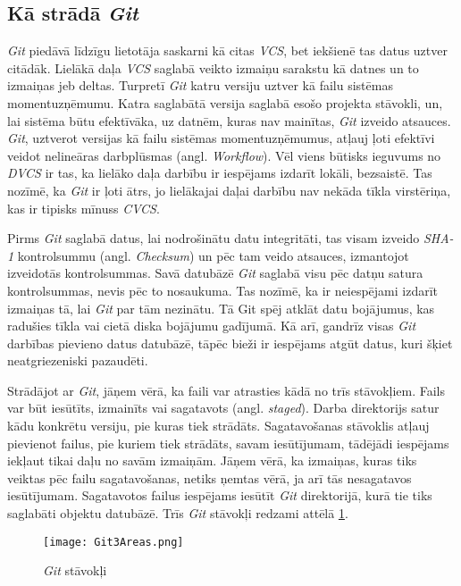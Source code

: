 \subsection{Kā strādā  \textit{Git}}
 \textit{Git} piedāvā līdzīgu lietotāja saskarni kā citas  \textit{VCS}, bet iekšienē tas datus uztver citādāk. Lielākā daļa  \textit{VCS} saglabā veikto izmaiņu sarakstu kā datnes un to izmaiņas jeb deltas.
Turpretī  \textit{Git} katru versiju uztver kā failu sistēmas momentuzņēmumu. Katra saglabātā versija saglabā esošo projekta stāvokli, un, lai sistēma būtu efektīvāka, uz datnēm, kuras nav mainītas,  \textit{Git} izveido atsauces.  \textit{Git}, uztverot versijas kā failu sistēmas momentuzņēmumus, atļauj ļoti efektīvi veidot nelineāras darbplūsmas (angl. \textit{Workflow}).
Vēl viens būtisks ieguvums no  \textit{DVCS} ir tas, ka lielāko daļa darbību ir iespējams izdarīt lokāli, bezsaistē. Tas nozīmē, ka  \textit{Git} ir ļoti ātrs, jo lielākajai daļai darbību nav nekāda tīkla virstēriņa, kas ir tipisks mīnuss \textit{CVCS}.

Pirms \textit{Git} saglabā datus, lai nodrošinātu datu integritāti, tas visam izveido \textit{SHA-1} kontrolsummu (angl. \textit{Checksum}) un pēc tam veido atsauces, izmantojot izveidotās kontrolsummas. Savā datubāzē \textit{Git} saglabā visu pēc datņu satura kontrolsummas, nevis pēc to nosaukuma. Tas nozīmē, ka ir neiespējami izdarīt izmaiņas tā, lai \textit{Git} par tām nezinātu. Tā Git spēj atklāt datu bojājumus, kas radušies tīkla vai cietā diska bojājumu gadījumā. Kā arī, gandrīz visas \textit{Git} darbības pievieno datus datubāzē, tāpēc bieži ir iespējams atgūt datus, kuri šķiet neatgriezeniski pazaudēti.

Strādājot ar \textit{Git}, jāņem vērā, ka faili var atrasties kādā no trīs stāvokļiem. Fails var būt iesūtīts, izmainīts vai sagatavots (angl. \textit{staged}). Darba direktorijs satur kādu konkrētu versiju, pie kuras tiek strādāts. Sagatavošanas stāvoklis atļauj pievienot failus, pie kuriem tiek strādāts, savam iesūtījumam, tādējādi iespējams iekļaut tikai daļu no savām izmaiņām. Jāņem vērā, ka izmaiņas, kuras tiks veiktas pēc failu sagatavošanas, netiks ņemtas vērā, ja arī tās nesagatavos iesūtījumam. Sagatavotos failus iespējams iesūtīt \textit{Git} direktorijā, kurā tie tiks saglabāti objektu datubāzē.
Trīs \textit{Git} stāvokļi redzami attēlā \ref{fig:Git3Areas}. \cite{chacon2014progit}
\begin{figure}[H]%
	\centering
	\captionsetup{justification=centering}
	\texttt{[image: Git3Areas.png]}
	\caption{\textit{Git} stāvokļi}
	\label{fig:Git3Areas}
\end{figure}

